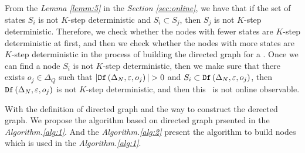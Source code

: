 From the {\em Lemma \ref{lemm:5}} in the {\em Section \ref{sec:online}}, we have that if the set of states $S_i$ is not $K$-step deterministic and $S_i\subset S_j$, then $S_j$ is not $K$-step deterministic. Therefore, we check whether the nodes with fewer states are $K$-step deterministic at first, and then we check whether the nodes with more states are $K$-step deterministic in the process of building the directed graph for a \BCN. Once we can find a node $S_i$ is not $K$-step deterministic, then we make sure that there exists $o_j \in \Delta_Q$ such that $|\Ded\left(\Delta_N,\varepsilon, o_j\right)|> 0$ and $S_i\subset {\tt Df}\left(\Delta_N,\varepsilon, o_j\right)$, then ${\tt Df}\left(\Delta_N,\varepsilon,o_j\right)$ is not $K$-step deterministic, and then this \BCN\ is not online observable. %

With the definition of directed graph and the way to construct the derected graph. We propose the algorithm based on directed graph prsented in the {\em Algorithm.\ref{alg:1}}. And the {\em Algorithm.\ref{alg:2}} present the algorithm to build nodes which is used in the {\em Algorithm.\ref{alg:1}}.

